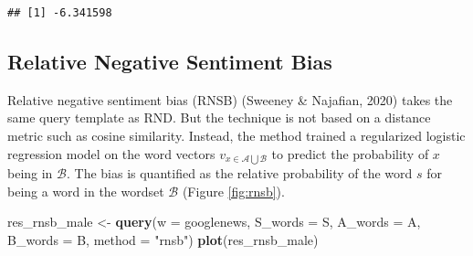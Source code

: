 \documentclass[english,man]{apa6}
\newenvironment{Shaded}{\begin{snugshade}}{\end{snugshade}}
\newcommand{\DataTypeTok}[1]{\textcolor[rgb]{0.13,0.29,0.53}{#1}}
\newcommand{\KeywordTok}[1]{\textcolor[rgb]{0.13,0.29,0.53}{\textbf{#1}}}
\newcommand{\NormalTok}[1]{#1}
\newcommand{\StringTok}[1]{\textcolor[rgb]{0.31,0.60,0.02}{#1}}
\begin{document}
\begin{verbatim}
## [1] -6.341598
\end{verbatim}

\hypertarget{relative-negative-sentiment-bias}{%
\subsection{Relative Negative Sentiment Bias}\label{relative-negative-sentiment-bias}}

Relative negative sentiment bias (RNSB) (Sweeney \& Najafian, 2020) takes the same query template as RND. But the technique is not based on a distance metric such as cosine similarity. Instead, the method trained a regularized logistic regression model on the word vectors \(v_{x \in \mathcal{A} \bigcup \mathcal{B}}\) to predict the probability of \(x\) being in \(\mathcal{B}\). The bias is quantified as the relative probability of the word \(s\) for being a word in the wordset \(\mathcal{B}\) (Figure \ref{fig:rnsb}).

\begin{Shaded}
\begin{Highlighting}[]
\NormalTok{res_rnsb_male <-}\StringTok{ }\KeywordTok{query}\NormalTok{(}\DataTypeTok{w =}\NormalTok{ googlenews, }\DataTypeTok{S_words =}\NormalTok{ S, }\DataTypeTok{A_words =}\NormalTok{ A,}
                       \DataTypeTok{B_words =}\NormalTok{ B, }\DataTypeTok{method =} \StringTok{"rnsb"}\NormalTok{)}
\KeywordTok{plot}\NormalTok{(res_rnsb_male)}
\end{Highlighting}
\end{Shaded}
\end{document}
